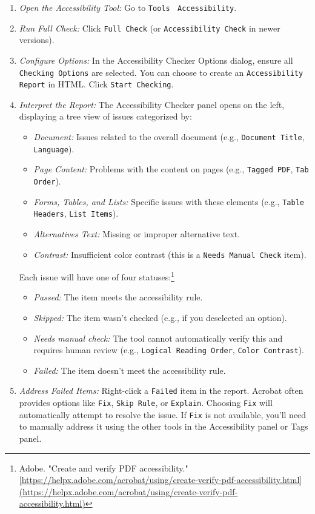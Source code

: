 \begin{enumerate}
\item \emph{Open the Accessibility Tool:} Go to \texttt{Tools} $\>$ \texttt{Accessibility}.
\item \emph{Run Full Check:} Click \texttt{Full Check} (or \texttt{Accessibility Check} in newer versions).
\item \emph{Configure Options:} In the Accessibility Checker Options dialog, ensure all \texttt{Checking Options} are selected. You can choose to create an \texttt{Accessibility Report} in HTML. Click \texttt{Start Checking}.
\item \emph{Interpret the Report:} The Accessibility Checker panel opens on the left, displaying a tree view of issues categorized by:
    \begin{itemize}
    \item \emph{Document:} Issues related to the overall document (e.g., \texttt{Document Title}, \texttt{Language}).
    \item \emph{Page Content:} Problems with the content on pages (e.g., \texttt{Tagged PDF}, \texttt{Tab Order}).
    \item \emph{Forms, Tables, and Lists:} Specific issues with these elements (e.g., \texttt{Table Headers}, \texttt{List Items}).
    \item \emph{Alternatives Text:} Missing or improper alternative text.
    \item \emph{Contrast:} Insufficient color contrast (this is a \texttt{Needs Manual Check} item).
    \end{itemize}
    Each issue will have one of four statuses:\footnote{Adobe. "Create and verify PDF accessibility." \url{[https://helpx.adobe.com/acrobat/using/create-verify-pdf-accessibility.html](https://helpx.adobe.com/acrobat/using/create-verify-pdf-accessibility.html)}}
    \begin{itemize}
    \item \emph{Passed:} The item meets the accessibility rule.
    \item \emph{Skipped:} The item wasn't checked (e.g., if you deselected an option).
    \item \emph{Needs manual check:} The tool cannot automatically verify this and requires human review (e.g., \texttt{Logical Reading Order}, \texttt{Color Contrast}).
    \item \emph{Failed:} The item doesn't meet the accessibility rule.
    \end{itemize}
\item \emph{Address Failed Items:} Right-click a \texttt{Failed} item in the report. Acrobat often provides options like \texttt{Fix}, \texttt{Skip Rule}, or \texttt{Explain}. Choosing \texttt{Fix} will automatically attempt to resolve the issue. If \texttt{Fix} is not available, you'll need to manually address it using the other tools in the Accessibility panel or Tags panel.
\end{enumerate}

